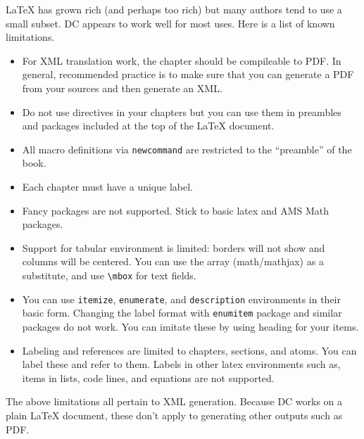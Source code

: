 LaTeX has grown rich (and perhaps too rich) but many authors tend to use a small subset.  
%
DC appears to work well for most uses. 
%
Here is a list of known limitations.  
\begin{itemize}

\item For XML translation work, the chapter should be compileable to PDF.  In general, recommended practice is to make sure that you can generate a PDF from your sources and then generate an XML.

\item Do not use \lstinline`` directives in your chapters but you can use them in preambles and packages included at the top of the LaTeX document.

\item All macro definitions via \lstinline`newcommand` are restricted to the ``preamble'' of the book.

\item Each chapter must have a unique label.

\item Fancy packages are not supported.  Stick to basic latex and AMS Math packages.

\item Support for tabular environment is limited: borders will not show and columns will be centered.  You can use the array (math/mathjax) as a substitute, and  use \lstinline`\mbox` for text fields.  
 
\item You can use \lstinline`itemize`, \lstinline`enumerate`, and \lstinline`description` environments in their basic form.  Changing the label format with \lstinline`enumitem` package and similar packages do not work.  You can imitate these by using heading for your items.  

\item Labeling and references are limited to chapters, sections, and atoms.  You can label these and refer to them.  Labels in other latex environments such as, items in lists, code lines, and equations are not supported.

\end{itemize}

\begin{remark}
The above limitations all pertain to XML generation.  Because DC works on a plain LaTeX document, these don't apply to generating other outputs such as 
PDF.
\end{remark}  




